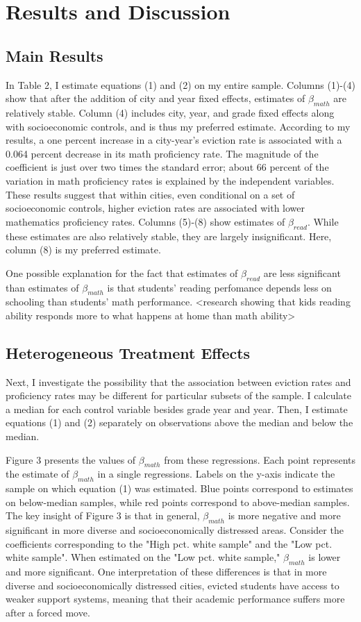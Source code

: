 \documentclass[12pt]{article}
\begin{document}
\section{Results and Discussion} \label{sec:result}
\subsection{Main Results}
In Table 2, I estimate equations (1) and (2) on my entire sample. Columns (1)-(4) show that after the addition of city and year fixed effects, estimates of $\beta_{math}$ are relatively stable. Column (4) includes city, year, and grade fixed effects along with socioeconomic controls, and is thus my preferred estimate. According to my results, a one percent increase in a city-year's eviction rate is associated with a 0.064 percent decrease in its math proficiency rate. The magnitude of the coefficient is just over two times the standard error; about 66 percent of the variation in math proficiency rates is explained by the independent variables. These results suggest that within cities, even conditional on a set of socioeconomic controls, higher eviction rates are associated with lower mathematics proficiency rates. Columns (5)-(8) show estimates of $\beta_{read}$. While these estimates are also relatively stable, they are largely insignificant. Here, column (8) is my preferred estimate.
    
One possible explanation for the fact that estimates of $\beta_{read}$ are less significant than estimates of $\beta_{math}$ is that students' reading perfomance depends less on schooling than students' math performance. <research showing that kids reading ability responds more to what happens at home than math ability>

\subsection{Heterogeneous Treatment Effects}
Next, I investigate the possibility that the association between eviction rates and proficiency rates may be different for particular subsets of the sample. I calculate a median for each control variable besides grade year and year. Then, I estimate equations (1) and (2) separately on observations above the median and below the median. 

Figure 3 presents the values of $\beta_{math}$ from these regressions. Each point represents the estimate of $\beta_{math}$ in a single regressions. Labels on the y-axis indicate the sample on which equation (1) was estimated. Blue points correspond to estimates on below-median samples, while red points correspond to above-median samples. The key insight of Figure 3 is that in general, $\beta_{math}$ is more negative and more significant in more diverse and socioeconomically distressed areas. Consider the coefficients corresponding to the "High pct. white sample" and the "Low pct. white sample". When estimated on the "Low pct. white sample," $\beta_{math}$ is lower and more significant. One interpretation of these differences is that in more diverse and socioeconomically distressed cities, evicted students have access to weaker support systems, meaning that their academic performance suffers more after a forced move. 
\end{document}
